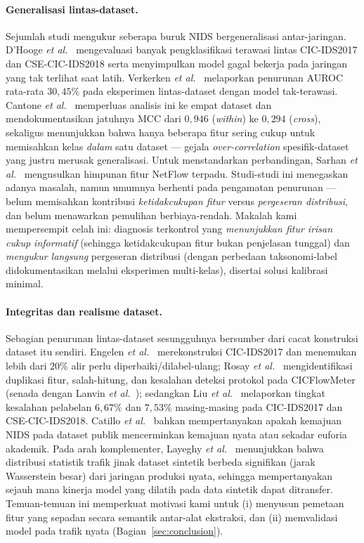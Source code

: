 \documentclass[11pt,a4paper]{article}
\begin{document}
\paragraph{Generalisasi lintas-dataset.} Sejumlah studi mengukur seberapa buruk
NIDS bergeneralisasi antar-jaringan. D'Hooge \emph{et al.}~\cite{dhooge}
mengevaluasi banyak pengklasifikasi terawasi lintas CIC-IDS2017 dan
CSE-CIC-IDS2018 serta menyimpulkan model gagal bekerja pada jaringan yang tak
terlihat saat latih. Verkerken \emph{et al.}~\cite{verkerken} melaporkan
penurunan AUROC rata-rata $30{,}45\%$ pada eksperimen lintas-dataset dengan model
tak-terawasi. Cantone \emph{et al.}~\cite{cantone} memperluas analisis ini ke
empat dataset dan mendokumentasikan jatuhnya MCC dari $0{,}946$ (\emph{within})
ke $0{,}294$ (\emph{cross}), sekaligus menunjukkan bahwa hanya beberapa fitur
sering cukup untuk memisahkan kelas \emph{dalam} satu dataset --- gejala
\emph{over-correlation} spesifik-dataset yang justru merusak generalisasi. Untuk
menstandarkan perbandingan, Sarhan \emph{et al.}~\cite{sarhan,sarhannf} mengusulkan
himpunan fitur NetFlow terpadu. Studi-studi ini menegaskan adanya masalah, namun
umumnya berhenti pada pengamatan penurunan --- belum memisahkan kontribusi
\emph{ketidakcukupan fitur} versus \emph{pergeseran distribusi}, dan belum
menawarkan pemulihan berbiaya-rendah. Makalah kami mempersempit celah ini:
diagnosis terkontrol yang \emph{menunjukkan fitur irisan cukup informatif} (sehingga
ketidakcukupan fitur bukan penjelasan tunggal) dan
\emph{mengukur langsung} pergeseran distribusi (dengan perbedaan taksonomi-label
didokumentasikan melalui eksperimen multi-kelas), disertai solusi kalibrasi minimal.

\paragraph{Integritas dan realisme dataset.} Sebagian penurunan lintas-dataset
sesungguhnya bersumber dari cacat konstruksi dataset itu sendiri. Engelen
\emph{et al.}~\cite{engelen} merekonstruksi CIC-IDS2017 dan menemukan lebih dari
$20\%$ alir perlu diperbaiki/dilabel-ulang; Rosay \emph{et al.}~\cite{rosay}
mengidentifikasi duplikasi fitur, salah-hitung, dan kesalahan deteksi protokol
pada CICFlowMeter (senada dengan Lanvin \emph{et al.}~\cite{lanvin}); sedangkan
Liu \emph{et al.}~\cite{liu} melaporkan tingkat
kesalahan pelabelan $6{,}67\%$ dan $7{,}53\%$ masing-masing pada CIC-IDS2017 dan
CSE-CIC-IDS2018. Catillo \emph{et al.}~\cite{catillo} bahkan mempertanyakan
apakah kemajuan NIDS pada dataset publik mencerminkan kemajuan nyata atau sekadar
euforia akademik. Pada arah komplementer, Layeghy \emph{et al.}~\cite{layeghy}
menunjukkan bahwa distribusi statistik trafik jinak dataset sintetik berbeda
signifikan (jarak Wasserstein besar) dari jaringan produksi nyata, sehingga
mempertanyakan sejauh mana kinerja model yang dilatih pada data sintetik dapat
ditransfer. Temuan-temuan ini memperkuat motivasi kami untuk (i) menyusun
pemetaan fitur yang sepadan secara semantik antar-alat ekstraksi, dan (ii)
memvalidasi model pada trafik nyata (Bagian~\ref{sec:conclusion}).
\end{document}
